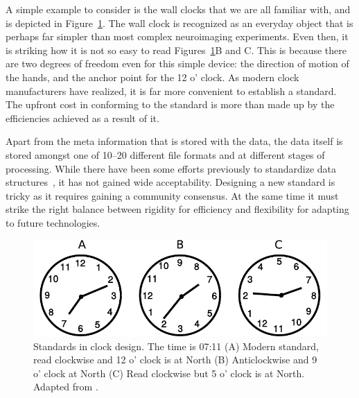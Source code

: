 A simple example to consider is the wall clocks that we are all familiar with, and is depicted in Figure~\ref{fig:clock_standards}. The wall clock is recognized as an everyday object that is perhaps far simpler than most complex neuroimaging experiments. Even then, it is striking how it is not so easy to read Figures~\ref{fig:clock_standards}B and C. This is because there are two degrees of freedom even for this simple device: the direction of motion of the hands, and the anchor point for the 12 o' clock. As modern clock manufacturers have realized, it is far more convenient to establish a standard. The upfront cost in conforming to the standard is more than made up by the efficiencies achieved as a result of it.

Apart from the meta information that is stored with the data, the data itself is stored amongst one of 10--20 different file formats and at different stages of processing. While there have been some efforts previously to standardize data structures~\citep{gibson2009minimum, grewe2011bottom, stoewer2013singlefile, teeters2015neurodata, bigdely2016preparing}, it has not gained wide acceptability. Designing a new standard is tricky as it requires gaining a community consensus. At the same time it must strike the right balance between rigidity for efficiency and flexibility for adapting to future technologies. 

\begin{figure}[t]
\begin{center}
   \includegraphics[width=0.7\linewidth]{figures/clock.pdf}
\end{center}
   \caption[Standards in clock design.]{Standards in clock design. The time is 07:11 (A) Modern standard, read clockwise and 12 o' clock is at North (B) Anticlockwise and 9 o' clock at North (C) Read clockwise but 5 o' clock is at North. Adapted from \cite{norman2013design}.}
   \label{fig:clock_standards}
\end{figure}
 
